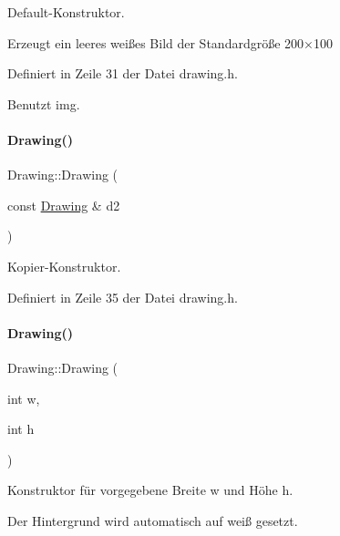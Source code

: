 Default-\/\+Konstruktor. 

Erzeugt ein leeres weißes Bild der Standardgröße 200×100 

Definiert in Zeile 31 der Datei drawing.\+h.



Benutzt img.

\mbox{\label{classDrawing_a17c39c9f29437c7f30fb22a1b007833d}} 
\paragraph{\texorpdfstring{Drawing()}{Drawing()}\hspace{0.1cm}{\footnotesize\ttfamily [2/4]}}
{\footnotesize\ttfamily Drawing\+::\+Drawing (\begin{DoxyParamCaption}\item[{const \mbox{\hyperlink{classDrawing}{Drawing}} \&}]{d2 }\end{DoxyParamCaption})\hspace{0.3cm}{\ttfamily [inline]}}



Kopier-\/\+Konstruktor. 



Definiert in Zeile 35 der Datei drawing.\+h.

\mbox{\label{classDrawing_a15cdefe87db87a22c59e61e64c849cfd}} 
\paragraph{\texorpdfstring{Drawing()}{Drawing()}\hspace{0.1cm}{\footnotesize\ttfamily [3/4]}}
{\footnotesize\ttfamily Drawing\+::\+Drawing (\begin{DoxyParamCaption}\item[{int}]{w,  }\item[{int}]{h }\end{DoxyParamCaption})\hspace{0.3cm}{\ttfamily [inline]}}



Konstruktor für vorgegebene Breite {\ttfamily w} und Höhe {\ttfamily h}. 

Der Hintergrund wird automatisch auf weiß gesetzt. 

